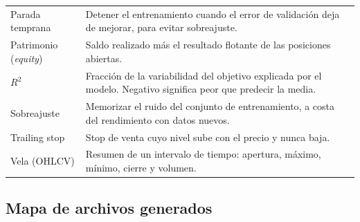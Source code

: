 \documentclass[11pt,a4paper]{article}
\begin{document}
\begin{longtable}{@{}p{4.3cm} p{\dimexpr\linewidth-4.8cm\relax}@{}}
Parada temprana & Detener el entrenamiento cuando el error de validación deja de mejorar, para evitar sobreajuste. \\
Patrimonio (\textit{equity}) & Saldo realizado más el resultado flotante de las posiciones abiertas. \\
$R^2$ & Fracción de la variabilidad del objetivo explicada por el modelo. Negativo significa peor que predecir la media. \\
Sobreajuste & Memorizar el ruido del conjunto de entrenamiento, a costa del rendimiento con datos nuevos. \\
Trailing stop & Stop de venta cuyo nivel sube con el precio y nunca baja. \\
Vela (OHLCV) & Resumen de un intervalo de tiempo: apertura, máximo, mínimo, cierre y volumen. \\
\bottomrule
\end{longtable}

\subsection{Mapa de archivos generados}
\end{document}
